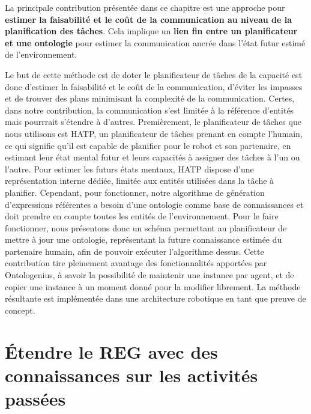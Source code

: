 La principale contribution présentée dans ce chapitre est une approche pour \textbf{estimer la faisabilité et le coût de la communication au niveau de la planification des tâches}. Cela implique un \textbf{lien fin entre un planificateur et une ontologie} pour estimer la communication ancrée dans l'état futur estimé de l'environnement. 

Le but de cette méthode est de doter le planificateur de tâches de la capacité est donc d'estimer la faisabilité et le coût de la communication, d'éviter les impasses et de trouver des plans minimisant la complexité de la communication. Certes, dans notre contribution, la communication s'est limitée à la référence d'entités mais pourrrait s'étendre à d'autres. Premièrement, le planificateur de tâches que nous utilisons est HATP, un planificateur de tâches prenant en compte l'humain, ce qui signifie qu'il est capable de planifier pour le robot et son partenaire, en estimant leur état mental futur et leurs capacités à assigner des tâches à l'un ou l'autre. Pour estimer les futurs états mentaux, HATP dispose d'une représentation interne dédiée, limitée aux entités utilisées dans la tâche à planifier. Cependant, pour fonctionner, notre algorithme de génération d'expressions référentes a besoin d'une ontologie comme base de connaissances et doit prendre en compte toutes les entités de l'environnement. Pour le faire fonctionner, nous présentons donc un schéma permettant au planificateur de mettre à jour une ontologie, représentant la future connaissance estimée du partenaire humain, afin de pouvoir exécuter l'algorithme dessus. Cette contribution tire pleinement avantage des fonctionnalités apportées par Ontologenius, à savoir la possibilité de maintenir une instance par agent, et de copier une instance à un moment donné pour la modifier librement. La méthode résultante est implémentée dans une architecture robotique en tant que preuve de concept. 

\section*{Étendre le REG avec des connaissances sur les activités passées}


